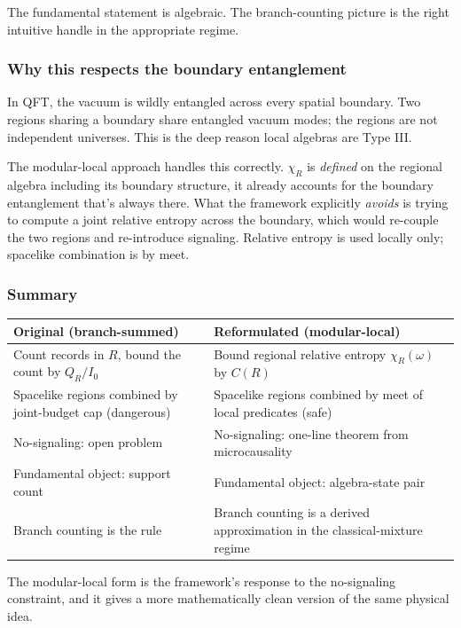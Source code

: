 \documentclass[11pt,a4paper]{article}
\begin{document}
The fundamental statement is algebraic. The branch-counting picture is the right intuitive handle in the appropriate regime.

\subsubsection{Why this respects the boundary entanglement}

In QFT, the vacuum is wildly entangled across every spatial boundary. Two regions sharing a boundary share entangled vacuum modes; the regions are not independent universes. This is the deep reason local algebras are Type III.

The modular-local approach handles this correctly. $\chi_R$ is \emph{defined} on the regional algebra including its boundary structure, it already accounts for the boundary entanglement that's always there. What the framework explicitly \emph{avoids} is trying to compute a joint relative entropy across the boundary, which would re-couple the two regions and re-introduce signaling. Relative entropy is used locally only; spacelike combination is by meet.

\subsubsection{Summary}

\begin{center}
\small
\begin{tabularx}{\linewidth}{|Y|Y|}
\hline
\textbf{Original (branch-summed)} & \textbf{Reformulated (modular-local)} \\
\hline
Count records in $R$, bound the count by $Q_R/I_0$ & Bound regional relative entropy $\chi_R(\omega)$ by $C(R)$ \\
\hline
Spacelike regions combined by joint-budget cap (dangerous) & Spacelike regions combined by meet of local predicates (safe) \\
\hline
No-signaling: open problem & No-signaling: one-line theorem from microcausality \\
\hline
Fundamental object: support count & Fundamental object: algebra-state pair \\
\hline
Branch counting is the rule & Branch counting is a derived approximation in the classical-mixture regime \\
\hline
\end{tabularx}
\end{center}

The modular-local form is the framework's response to the no-signaling constraint, and it gives a more mathematically clean version of the same physical idea.
\end{document}
